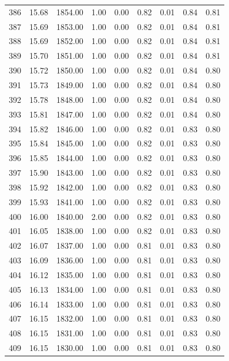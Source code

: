 \documentclass{article}\usepackage[]{graphicx}\usepackage[]{color}
\begin{document}
\begin{longtable}{rrrrrrrrr}
  386 & 15.68 & 1854.00 & 1.00 & 0.00 & 0.82 & 0.01 & 0.84 & 0.81 \\ 
  387 & 15.69 & 1853.00 & 1.00 & 0.00 & 0.82 & 0.01 & 0.84 & 0.81 \\ 
  388 & 15.69 & 1852.00 & 1.00 & 0.00 & 0.82 & 0.01 & 0.84 & 0.81 \\ 
  389 & 15.70 & 1851.00 & 1.00 & 0.00 & 0.82 & 0.01 & 0.84 & 0.81 \\ 
  390 & 15.72 & 1850.00 & 1.00 & 0.00 & 0.82 & 0.01 & 0.84 & 0.80 \\ 
  391 & 15.73 & 1849.00 & 1.00 & 0.00 & 0.82 & 0.01 & 0.84 & 0.80 \\ 
  392 & 15.78 & 1848.00 & 1.00 & 0.00 & 0.82 & 0.01 & 0.84 & 0.80 \\ 
  393 & 15.81 & 1847.00 & 1.00 & 0.00 & 0.82 & 0.01 & 0.84 & 0.80 \\ 
  394 & 15.82 & 1846.00 & 1.00 & 0.00 & 0.82 & 0.01 & 0.83 & 0.80 \\ 
  395 & 15.84 & 1845.00 & 1.00 & 0.00 & 0.82 & 0.01 & 0.83 & 0.80 \\ 
  396 & 15.85 & 1844.00 & 1.00 & 0.00 & 0.82 & 0.01 & 0.83 & 0.80 \\ 
  397 & 15.90 & 1843.00 & 1.00 & 0.00 & 0.82 & 0.01 & 0.83 & 0.80 \\ 
  398 & 15.92 & 1842.00 & 1.00 & 0.00 & 0.82 & 0.01 & 0.83 & 0.80 \\ 
  399 & 15.93 & 1841.00 & 1.00 & 0.00 & 0.82 & 0.01 & 0.83 & 0.80 \\ 
  400 & 16.00 & 1840.00 & 2.00 & 0.00 & 0.82 & 0.01 & 0.83 & 0.80 \\ 
  401 & 16.05 & 1838.00 & 1.00 & 0.00 & 0.82 & 0.01 & 0.83 & 0.80 \\ 
  402 & 16.07 & 1837.00 & 1.00 & 0.00 & 0.81 & 0.01 & 0.83 & 0.80 \\ 
  403 & 16.09 & 1836.00 & 1.00 & 0.00 & 0.81 & 0.01 & 0.83 & 0.80 \\ 
  404 & 16.12 & 1835.00 & 1.00 & 0.00 & 0.81 & 0.01 & 0.83 & 0.80 \\ 
  405 & 16.13 & 1834.00 & 1.00 & 0.00 & 0.81 & 0.01 & 0.83 & 0.80 \\ 
  406 & 16.14 & 1833.00 & 1.00 & 0.00 & 0.81 & 0.01 & 0.83 & 0.80 \\ 
  407 & 16.15 & 1832.00 & 1.00 & 0.00 & 0.81 & 0.01 & 0.83 & 0.80 \\ 
  408 & 16.15 & 1831.00 & 1.00 & 0.00 & 0.81 & 0.01 & 0.83 & 0.80 \\ 
  409 & 16.15 & 1830.00 & 1.00 & 0.00 & 0.81 & 0.01 & 0.83 & 0.80 \\ 

\end{longtable}
\end{document}
